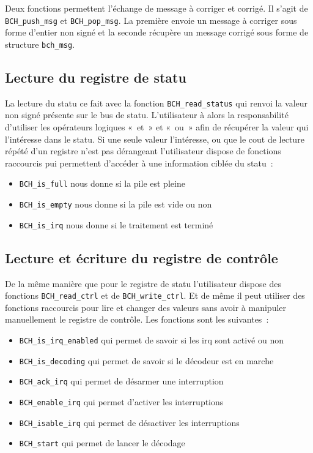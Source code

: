 \documentclass[a4paper, 11pt, svgnames]{report}
\begin{document}
    Deux fonctions permettent l'échange de message à corriger et corrigé. Il
    s'agit de \verb$BCH_push_msg$ et \verb$BCH_pop_msg$. La première envoie un
    message à corriger sous forme d'entier non signé et la seconde récupère un
    message corrigé sous forme de structure \verb$bch_msg$.

    \subsection{Lecture du registre de statu}

    La lecture du statu ce fait avec la fonction \verb$BCH_read_status$ qui
    renvoi la valeur non signé présente sur le bus de statu. L'utilisateur à
    alors la responsabilité d'utiliser les opérateurs logiques «~et~» et «~ou~»
    afin de récupérer la valeur qui l'intéresse dans le statu. Si une seule
    valeur l'intéresse, ou que le cout de lecture répété d'un registre n'est
    pas dérangeant l'utilisateur dispose de fonctions raccourcis pui permettent
    d'accéder à une information ciblée du statu~:
    \begin{itemize}
        \item \verb$BCH_is_full$ nous donne si la pile est pleine
        \item \verb$BCH_is_empty$ nous donne si la pile est vide ou non
        \item \verb$BCH_is_irq$ nous donne si le traitement est terminé
    \end{itemize}

    \subsection{Lecture et écriture du registre de contrôle}

    De la même manière que pour le registre de statu l'utilisateur dispose des
    fonctions \verb$BCH_read_ctrl$ et de \verb$BCH_write_ctrl$. Et de même il
    peut utiliser des fonctions raccourcis pour lire et changer des valeurs sans
    avoir à manipuler manuellement le registre de contrôle. Les fonctions sont
    les suivantes~:
    \begin{itemize}
        \item \verb$BCH_is_irq_enabled$ qui permet de savoir si les irq sont activé ou non
        \item \verb$BCH_is_decoding$ qui permet de savoir si le décodeur est en marche
        \item \verb$BCH_ack_irq$ qui permet de désarmer une interruption
        \item \verb$BCH_enable_irq$ qui permet d'activer les interruptions
        \item \verb$BCH_isable_irq$ qui permet de désactiver les interruptions
        \item \verb$BCH_start$ qui permet de lancer le décodage
    \end{itemize}
\end{document}

